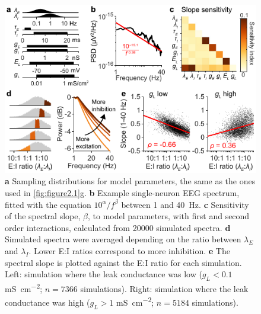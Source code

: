 \begin{figure}
  \begin{minipage}[c]{90mm}
    \includegraphics[width=\textwidth]{Figures/chapter2/figure6.pdf}
  \end{minipage}\hfill
  \begin{minipage}[c]{70mm}
    \caption{
	\textbf{a} Sampling distributions for model parameters, the same as the ones used in \autoref{fig:figure2.1}g.
	\textbf{b} Example single-neuron EEG spectrum, fitted with the equation ${10}^\alpha/f^\beta$ between 1 and \qty{40}{\hertz}.
	\textbf{c} Sensitivity of the spectral slope, $\beta$, to model parameters, with first and second order interactions, calculated from 20000 simulated spectra.
	\textbf{d} Simulated spectra were averaged depending on the ratio between $\lambda_E$ and $\lambda_I$. Lower E:I ratios correspond to more inhibition.
	\textbf{e} The spectral slope is plotted against the E:I ratio for each simulation. Left: simulation where the leak conductance was low ($g_L<0.1$ \unit{\milli\siemens\per\centi\meter\squared}; $n=7366$ simulations). Right: simulation where the leak conductance was high ($g_L>1$ \unit{\milli\siemens\per\centi\meter\squared}; $n=5184$ simulations).
    } \label{fig:figure2.6}
  \end{minipage}
\end{figure}

